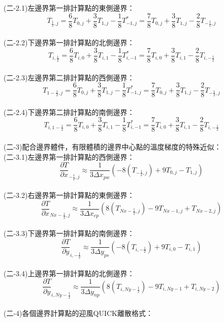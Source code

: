 \documentclass[12pt]{article}
\begin{document}
\noindent (二-2.1)左邊界第一排計算點的東側邊界：$$T_{\frac{1}{2},j} = \frac{6}{8}T_{0,j}+\frac{3}{8}T_{1,j}-\frac{1}{8}T_{-1,j}^{*} =\frac{7}{8}T_{0,j}+\frac{3}{8}T_{1,j}-\frac{2}{8}T_{-\frac{1}{2},j}  $$\\
\noindent (二-2.2)下邊界第一排計算點的北側邊界：$$T_{i,\frac{1}{2}} = \frac{6}{8}T_{i,0}+\frac{3}{8}T_{i,1}-\frac{1}{8}T_{i,-1}^{*} = \frac{7}{8}T_{i,0}+\frac{3}{8}T_{i,1}-\frac{2}{8}T_{i,-\frac{1}{2}}$$\\
\noindent (二-2.3)左邊界第二排計算點的西側邊界：$$T_{1-\frac{1}{2},j} = \frac{6}{8}T_{0,j}+\frac{3}{8}T_{1,j}-\frac{1}{8}T_{-1,j}^{*} = \frac{7}{8}T_{0,j}+\frac{3}{8}T_{1,j}-\frac{2}{8}T_{-\frac{1}{2},j}$$\\
\noindent (二-2.4)下邊界第二排計算點的南側邊界：$$T_{i,1-\frac{1}{2}} = \frac{6}{8}T_{i,0}+\frac{3}{8}T_{i,1}-\frac{1}{8}T_{i,-1}^{*} = \frac{7}{8}T_{i,0}+\frac{3}{8}T_{i,1}-\frac{2}{8}T_{i,-\frac{1}{2}} $$\\
\noindent (二-3)配合邊界體件，有限體積的邊界中心點的溫度梯度的特殊近似：\\

\noindent (二-3.1)左邊界第一排計算點的西側邊界：$$\frac{\partial T}{\partial x}_{-\frac{1}{2},j} \approx \frac{1}{3\Delta x_{pw}}(-8(T_{-\frac{1}{2},j})+9T_{0,j}-T_{1,j})$$\\
\noindent (二-3.2)右邊界第一排計算點的東側邊界：$$\frac{\partial T}{\partial x}_{Nx-\frac{1}{2},j} \approx \frac{1}{3\Delta x_{ep}}(8(T_{Nx-\frac{1}{2},j})-9T_{Nx-1,j}+T_{Nx-2,j})$$\\
\noindent (二-3.3)下邊界第一排計算點的南側邊界：$$\frac{\partial T}{\partial y}_{i,-\frac{1}{2}} \approx \frac{1}{3\Delta y_{ps}}(-8(T_{i,-\frac{1}{2}})+9T_{i,0}-T_{i,1})$$\\
\noindent (二-3.4)上邊界第一排計算點的北側邊界：$$\frac{\partial T}{\partial y}_{i,Ny-\frac{1}{2}} \approx \frac{1}{3\Delta y_{np}}(8(T_{i,Ny-\frac{1}{2}})-9T_{i,Ny-1}+T_{i,Ny-2})$$\\
\noindent (二-4)各個邊界計算點的迎風QUICK離散格式：\\
\end{document}
